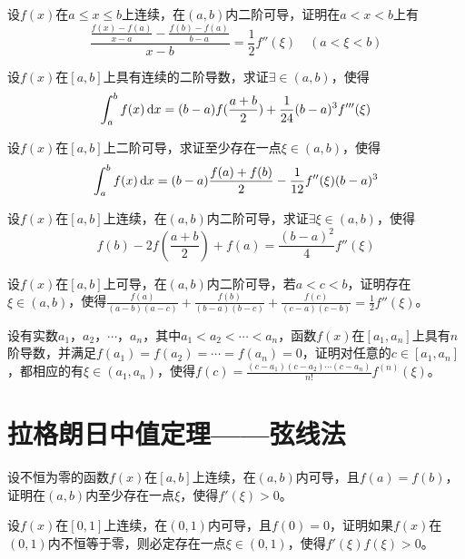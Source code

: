 \begin{example}
	设$f(x)$在$a\leqslant x\leqslant b$上连续，在$(a,b)$内二阶可导，证明在$a<x<b$上有\[\frac{\frac{f(x)-f(a)}{x-a}-\frac{f(b)-f(a)}{b-a}}{x-b}=\frac{1}{2}f''(\xi)\quad(a<\xi<b)\]
\end{example}

\begin{example}
	设$f(x)$在$[a,b]$上具有连续的二阶导数，求证$\exists\in(a,b)$，使得\[\int_{a}^{b}f(x)\,\mathrm{d} x=(b-a)f(\frac{a+b}{2})+\frac{1}{24}(b-a)^3f'''(\xi)\]
\end{example}

\begin{example}
	设$f(x)$在$[a,b]$上二阶可导，求证至少存在一点$\xi\in(a,b)$，使得\[\int_{a}^{b}f(x)\,\mathrm{d} x=(b-a)\frac{f(a)+f(b)}{2}-\frac{1}{12}f''(\xi)(b-a)^3\]
\end{example}

\begin{example}
	设$f(x)$在$[a,b]$上连续，在$(a,b)$内二阶可导，求证$\exists\xi\in(a,b)$，使得\[f(b)-2f(\frac{a+b}{2})+f(a)=\frac{(b-a)^2}{4}f''(\xi)\]
\end{example}

\begin{example}
	设$f(x)$在$[a,b]$上可导，在$(a,b)$内二阶可导，若$a<c<b$，证明存在$\xi\in(a,b)$，使得$\frac{f(a)}{(a-b)(a-c)}+\frac{f(b)}{(b-a)(b-c)}+\frac{f(c)}{(c-a)(c-b)}=\frac{1}{2}f''(\xi)$。
\end{example}

\begin{example}
	设有实数$a_1$，$a_2$，$\cdots$，$a_n$，其中$a_1<a_2<\cdots<a_n$，函数$f(x)$在$[a_1,a_n]$上具有$n$阶导数，并满足$f(a_1)=f(a_2)=\cdots=f(a_n)=0$，证明对任意的$c\in[a_1,a_n]$，都相应的有$\xi\in(a_1,a_n)$，使得$f(c)=\frac{(c-a_1)(c-a_2)\cdots(c-a_n)}{n!}f^{(n)}(\xi)$。
\end{example}

\section{拉格朗日中值定理——弦线法}
\begin{example}
	设不恒为零的函数$f(x)$在$[a,b]$上连续，在$(a,b)$内可导，且$f(a)=f(b)$，证明在$(a,b)$内至少存在一点$\xi$，使得$f'(\xi)>0$。
\end{example}

\begin{example}
	设$f(x)$在$[0,1]$上连续，在$(0,1)$内可导，且$f(0)=0$，证明如果$f(x)$在$(0,1)$内不恒等于零，则必定存在一点$\xi\in(0,1)$，使得$f'(\xi)f(\xi)>0$。
\end{example}


